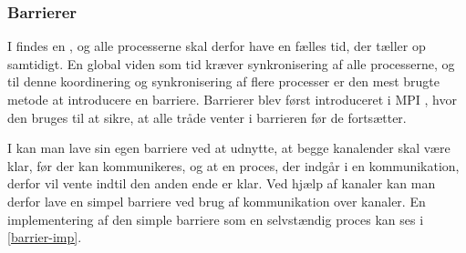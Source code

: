 \subsubsection{Barrierer} \label{sec:barrierer}

I \des findes en , og alle processerne skal derfor have en fælles tid, der tæller op 
samtidigt.  En global viden som tid kræver synkronisering af alle 
processerne, og til denne koordinering og synkronisering af flere 
processer er  den mest brugte metode at introducere en barriere. Barrierer blev først introduceret i MPI \cite{mpi-barrier}, hvor den bruges til at 
sikre, at alle tråde venter i barrieren før de  fortsætter. 

I \csp kan man lave sin egen barriere ved at udnytte, at begge 
kanalender skal være klar, før der kan kommunikeres, og at en proces, der 
indgår i en kommunikation, derfor vil vente indtil den anden ende er klar. Ved hjælp af kanaler kan man derfor lave en simpel barriere 
 ved brug af kommunikation over kanaler.  En implementering af den simple 
barriere som en selvstændig proces kan ses i \cref{barrier-imp}.

